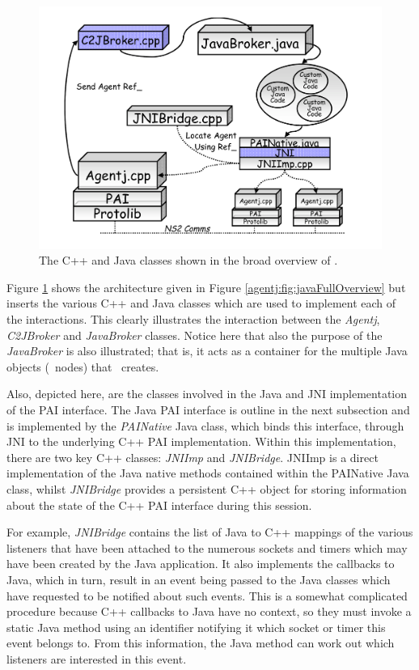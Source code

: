 \begin{figure}
\centering
\includegraphics[scale=0.4]{images/agentjOverviewWithClasses}
\caption{The C++ and Java classes shown in the broad overview of \agentj.} 
\label{agentj:fig:agentjOverviewClasses}
\end{figure}


Figure \ref{agentj:fig:agentjOverviewClasses} shows the \agentj architecture
given in Figure \ref{agentj:fig:javaFullOverview} but inserts the various C++ and
Java classes which are used to implement each of the interactions. This clearly illustrates the interaction between
the \emph{Agentj}, \emph{C2JBroker} and \emph{JavaBroker} 
classes. Notice here that also the purpose of the \emph{JavaBroker}
is also illustrated; that is, it acts as a container for the multiple Java
objects (\agentj~nodes) that \agentj~creates. 

Also, depicted here, are the classes involved in the Java and JNI 
implementation of the PAI interface.  The Java PAI interface is outline in 
the next subsection and is implemented by the \emph{PAINative} Java 
class, which binds this interface, through JNI to the underlying C++ 
PAI implementation.  Within this implementation, there are two key 
C++ classes: \emph{JNIImp} and \emph{JNIBridge}. JNIImp is
a direct implementation of the Java native methods contained within
the PAINative Java class, whilst \emph{JNIBridge} provides a 
persistent C++ object for storing information about the state of the
C++ PAI interface during this session.  

For example, \emph{JNIBridge}
contains the list of Java to C++ mappings of the various listeners that
have been attached to the numerous sockets and timers which may
have been created by the Java application.  It also implements the
callbacks to Java, which in turn, result in an event being passed 
to the Java classes which have requested to be notified about 
such events. This is a somewhat complicated procedure because
C++ callbacks to Java have no context, so they must invoke a static
Java method using an identifier notifying it which socket or timer
this event belongs to. From this information, the Java method can
work out which listeners are interested in this event.   


